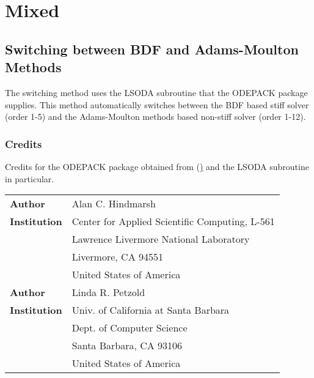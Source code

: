 \section{Mixed}
\subsection{Switching between BDF and Adams-Moulton Methods}
\label{subsec:LSODA}
The switching method uses the LSODA subroutine that the ODEPACK package supplies. This method automatically switches between the BDF based stiff solver (order 1-5) and the Adams-Moulton methods based non-stiff solver (order 1-12).

\subsubsection{Credits}
Credits for the ODEPACK package obtained from (\hyperlink{http://www.netlib.org/}) and the LSODA subroutine in particular.

\vspace{0.5cm}
\begin{tabular}{ l l }
 \textbf{Author}      & Alan C. Hindmarsh \\
 \textbf{Institution} & Center for Applied Scientific Computing, L-561 \\
                      & Lawrence Livermore National Laboratory \\
                      & Livermore, CA 94551 \\
                      & United States of America \\
 \textbf{Author}      & Linda R. Petzold \\
 \textbf{Institution} & Univ. of California at Santa Barbara \\
                      & Dept. of Computer Science \\
                      & Santa Barbara, CA 93106 \\
                      & United States of America \\
\end{tabular}
